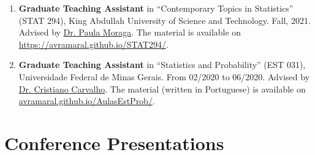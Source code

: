 \documentclass[10pt, ]{article}
\begin{document}
\begin{enumerate}[noitemsep, topsep=0pt]
		\item \textbf{Graduate Teaching Assistant} in ``Contemporary Topics in Statistics'' (STAT 294), King Abdullah University of Science and Technology. Fall, 2021. Advised by \href{https://www.paulamoraga.com/}{Dr. Paula Moraga}. The material is available on \href{https://avramaral.github.io/STAT294/}{\url{https://avramaral.github.io/STAT294/}}.
		
		\item \textbf{Graduate Teaching Assistant} in ``Statistics and Probability'' (EST 031), Universidade Federal de Minas Gerais. From 02/2020 to 06/2020. Advised by \href{http://www.est.ufmg.br/~cristianocs/}{Dr. Cristiano Carvalho}. The material (written in Portuguese) is available on \href{https://avramaral.github.io/AulasEstProb/}{\url{avramaral.github.io/AulasEstProb/}}.
	\end{enumerate}
	
	\vspace{10pt}
	
	\vspace{-12pt}
	\section*{Conference Presentations} \vspace{-5pt}
	
\end{document}
